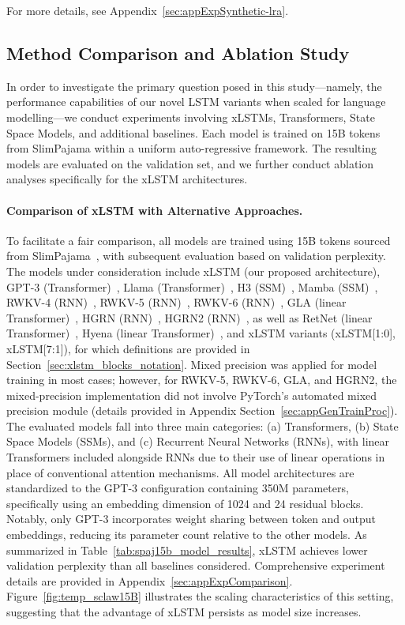 For more details, see Appendix~\ref{sec:appExpSynthetic-lra}.

\subsection{Method Comparison and Ablation Study}
\label{sec:ExpComparison}

In order to investigate the primary question posed in this study—namely, the performance capabilities of our novel LSTM variants when scaled for language modelling—we conduct experiments involving xLSTMs, Transformers, State Space Models, and additional baselines. Each model is trained on 15B tokens from SlimPajama within a uniform auto-regressive framework. The resulting models are evaluated on the validation set, and we further conduct ablation analyses specifically for the xLSTM architectures.

\paragraph{Comparison of xLSTM with Alternative Approaches.} To facilitate a fair comparison, all models are trained using 15B tokens sourced from SlimPajama~\citep{Soboleva:23}, with subsequent evaluation based on validation perplexity. The models under consideration include xLSTM (our proposed architecture), GPT-3 (Transformer)~\citep{Brown:20short}, Llama (Transformer)~\citep{Touvron:23arxiv}, H3 (SSM)~\citep{Fu:23}, Mamba (SSM)~\citep{Gu:24arxiv}, RWKV-4 (RNN)~\citep{Peng:23arxivshort}, RWKV-5 (RNN)~\citep{Peng:24arxivshort}, RWKV-6 (RNN)~\citep{Peng:24arxivshort}, GLA (linear Transformer)~\citep{Yang:23arxiv}, HGRN (RNN)~\citep{Qin:23}, HGRN2 (RNN)~\citep{Qin:24arxiv}, as well as RetNet (linear Transformer)~\citep{Sun:23arxiv}, Hyena (linear Transformer)~\citep{Poli:23}, and xLSTM variants (xLSTM[1:0], xLSTM[7:1]), for which definitions are provided in Section~\ref{sec:xlstm_blocks_notation}. Mixed precision was applied for model training in most cases; however, for RWKV-5, RWKV-6, GLA, and HGRN2, the mixed-precision implementation did not involve PyTorch's automated mixed precision module (details provided in Appendix Section~\ref{sec:appGenTrainProc}). The evaluated models fall into three main categories: (a) Transformers, (b) State Space Models (SSMs), and (c) Recurrent Neural Networks (RNNs), with linear Transformers included alongside RNNs due to their use of linear operations in place of conventional attention mechanisms. All model architectures are standardized to the GPT-3 configuration containing 350M parameters, specifically using an embedding dimension of 1024 and 24 residual blocks. Notably, only GPT-3 incorporates weight sharing between token and output embeddings, reducing its parameter count relative to the other models. As summarized in Table~\ref{tab:spaj15b_model_results}, xLSTM achieves lower validation perplexity than all baselines considered. Comprehensive experiment details are provided in Appendix~\ref{sec:appExpComparison}. Figure~\ref{fig:temp_sclaw15B} illustrates the scaling characteristics of this setting, suggesting that the advantage of xLSTM persists as model size increases.

